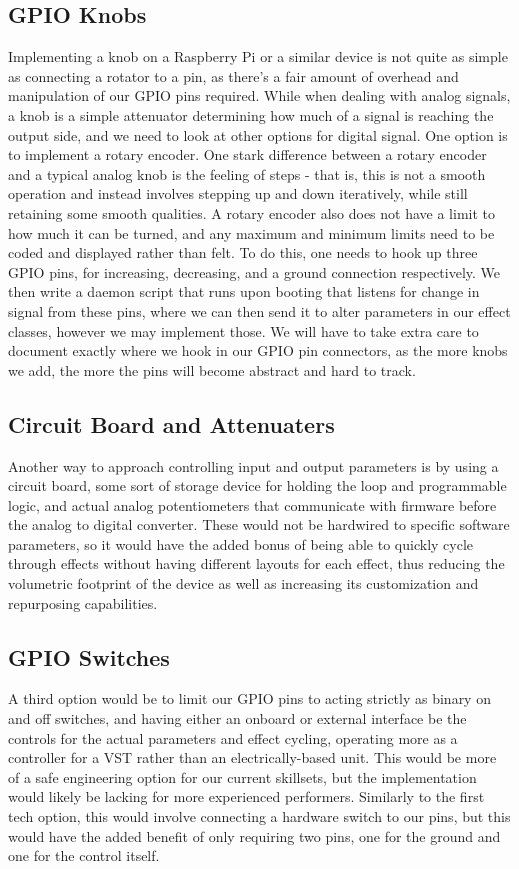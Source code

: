 \documentclass[onecolumn, draftclsnofoot,10pt, compsoc]{IEEEtran}
\begin{document}
\subsection{GPIO Knobs}
	Implementing a knob on a Raspberry Pi or a similar device is not quite as simple as connecting a rotator to a pin, as there’s a fair amount of overhead and manipulation of our GPIO pins required. While when dealing with analog signals, a knob is a simple attenuator determining how much of a signal is reaching the output side, and we need to look at other options for digital signal. One option is to implement a rotary encoder. One stark difference between a rotary encoder and a typical analog knob is the feeling of steps - that is, this is not a smooth operation and instead involves stepping up and down iteratively, while still retaining some smooth qualities. A rotary encoder also does not have a limit to how much it can be turned, and any maximum and minimum limits need to be coded and displayed rather than felt. To do this, one needs to hook up three GPIO pins, for increasing, decreasing, and a ground connection respectively. We then write a daemon script that runs upon booting that listens for change in signal from these pins, where we can then send it to alter parameters in our effect classes, however we may implement those. We will have to take extra care to document exactly where we hook in our GPIO pin connectors, as the more knobs we add, the more the pins will become abstract and hard to track\cite{GPIO}.
\subsection{Circuit Board and Attenuaters}
	Another way to approach controlling input and output parameters is by using a circuit board, some sort of storage device for holding the loop and programmable logic, and actual analog potentiometers that communicate with firmware before the analog to digital converter. These would not be hardwired to specific software parameters, so it would have the added bonus of being able to quickly cycle through effects without having different layouts for each effect, thus reducing the volumetric footprint of the device as well as increasing its customization and repurposing capabilities\cite{Proto}.
\subsection{GPIO Switches}
	A third option would be to limit our GPIO pins to acting strictly as binary on and off switches, and having either an onboard or external interface be the controls for the actual parameters and effect cycling, operating more as a controller for a VST rather than an electrically-based unit. This would be more of a safe engineering option for our current skillsets, but the implementation would likely be lacking for more experienced performers. Similarly to the first tech option, this would involve connecting a hardware switch to our pins, but this would have the added benefit of only requiring two pins, one for the ground and one for the control itself. 
\end{document}
